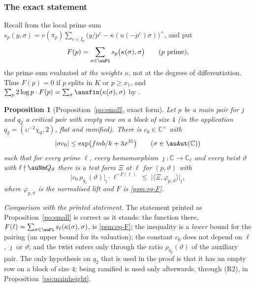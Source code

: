 \documentclass[10pt]{amsart}
\newtheorem{proposition}[theorem]{Proposition}
\theoremstyle{definition}
\theoremstyle{remark}
\newcommand{\C}{\mathbb C}
\begin{document}
\subsubsection{The exact statement}\label{psm:ss-statement}

Recall from {\cite[Definition~14.8]{P46}} the local prime sum
$s_p(y,\sigma)=v(\pi_p)\allowbreak \sum_{e\in I_p}\allowbreak \bigl(y/p^e-\kappa(u(-p^e)\sigma)\bigr)^+$, and put
\begin{equation}\label{psm:eq-F}
F(p)=\sum_{\sigma\in\auPl}s_p\bigl(\kappa(\sigma),\sigma\bigr)\qquad(p\text{ prime}),
\end{equation}
the prime sum evaluated \emph{at the weights $\kappa$}, not at the degrees of differentiation.
Thus $F(p)=0$ if $p$ splits in $K$ or $p\ge x_1$, and $\sum_p2\log p\cdot F(p)=\sum_\sigma
\ausfin(\kappa(\sigma),\sigma)$ by {\cite[Lemma~14.9(a)]{P46}}.

\begin{proposition}[Proposition~\ref{po:small}, exact form]\label{psm:small}
Let $p$ be a main pair for $j$ and $q_2$ a critical pair with empty row on a block of size $4$
\textup{(}in the application $q_2=(\upsilon^{-2}\chi_0,2)$, flat and ramified\textup{)}. There is
$c_0\in\C^\times$ with
\[
|\sigma c_0|\le\exp\bigl(fmb/k+3x^{35}\bigr)\qquad(\sigma\in\auAut(\C))
\]
such that for every prime $\ell$, every homomorphism $\jmath\colon\C\to\C_\ell$ and every twist
$\vartheta$ with $\ell\nmid\auNm Q_\vartheta$ there is a test form $\Xi$ at $\ell$ for
$(p,\vartheta)$ with
\begin{equation}\label{psm:eq-small}
\bigl|c_0\,\rho_{q_2}(\vartheta)\bigr|_\jmath\cdot\ell^{-F(\ell)}\ \le\ \bigl|\langle\Xi,
\varphi_{p,\vartheta}\rangle\bigr|_\jmath ,
\end{equation}
where $\varphi_{p,\vartheta}$ is the normalised lift and $F$ is \eqref{psm:eq-F}.
\end{proposition}

\emph{Comparison with the printed statement.} The statement printed as Proposition~\ref{po:small}
is correct as it stands: the function there, $F(\ell)=\sum_{\sigma\in\auPl}s_\ell(\kappa(\sigma),
\sigma)$, is \eqref{psm:eq-F}; the inequality is a \emph{lower} bound for the pairing (an upper
bound for its valuation); the constant $c_0$ does not depend on $\ell$, $\jmath$ or $\vartheta$; and
the twist enters only through the ratio $\rho_{q_2}(\vartheta)$ of the auxiliary pair. The only
hypothesis on $q_2$ that is used in the proof is that it has an empty row on a block of size $4$;
being ramified is used only afterwards, through (R2), in Proposition~\ref{po:mainheight}.
\end{document}

